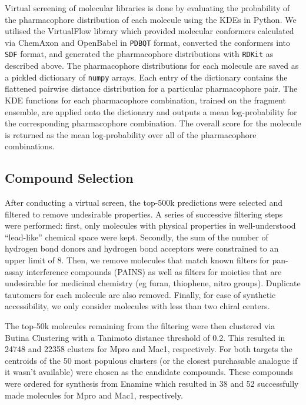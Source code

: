 Virtual screening of molecular libraries is done by evaluating the probability of the pharmacophore distribution of each molecule using the KDEs in Python. We utilised the VirtualFlow library which provided molecular conformers calculated via ChemAxon and OpenBabel in \texttt{PDBQT} format, converted the conformers into \texttt{SDF} format, and generated the pharmacophore distributions with \texttt{RDKit} as described above. The pharmacophore distributions for each molecule are saved as a pickled dictionary of \texttt{numpy} arrays. Each entry of the dictionary contains the flattened pairwise distance distribution for a particular pharmacophore pair. The KDE functions for each pharmacophore combination, trained on the fragment ensemble, are applied onto the dictionary and outputs a mean log-probability for the corresponding pharmacophore combination. The overall score for the molecule is returned as the mean log-probability over all of the pharmacophore combinations.

\subsection{Compound Selection} \label{subsec:compound_selection}
After conducting a virtual screen, the top-500k predictions were selected and filtered to remove undesirable properties. A series of successive filtering steps were performed: first, only molecules with physical properties in well-understood ``lead-like'' chemical space \cite{ChemSpace} were kept. Secondly, the sum of the number of hydrogen bond donors and hydrogen bond acceptors were constrained to an upper limit of 8. Then, we remove molecules that match known filters for pan-assay interference compounds (PAINS) \cite{Baell2010Pains} as well as filters for moieties that are undesirable for medicinal chemistry (eg furan, thiophene, nitro groups). Duplicate tautomers for each molecule are also removed. Finally, for ease of synthetic accessibility, we only consider molecules with less than two chiral centers.

The top-50k molecules remaining from the filtering were then clustered via Butina Clustering \cite{Butina1999Clustering} with a Tanimoto distance threshold of 0.2. This resulted in 24748 and 22358 clusters for Mpro and Mac1, respectively. For both targets the centroids of the 50 most populous clusters (or the closest purchasable analogue if it wasn't available) were chosen as the candidate compounds. These compounds were ordered for synthesis from Enamine which resulted in 38 and 52 successfully made molecules for Mpro and Mac1, respectively.


